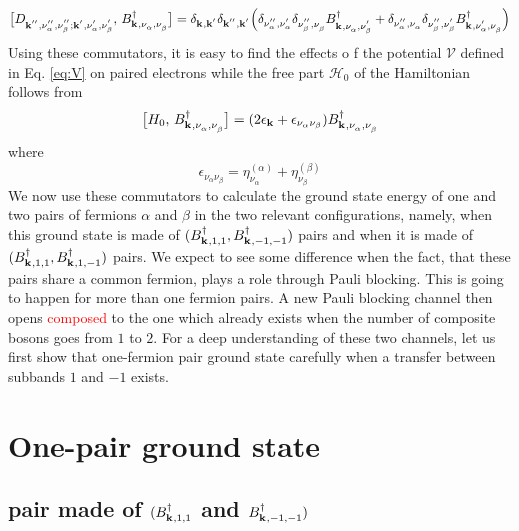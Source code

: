 \documentclass[11pt]{article} %
\newcommand{\ns}[1]{\textcolor{red}{#1}}
\begin{document}
\begin{equation}
\big[D^{}_{\mathbf{k}^{'' },\nu_{\alpha}^{''},\nu_{\beta}^{''};\mathbf{k}^{' },\nu_{\alpha}^{'},\nu_{\beta}^{'}},\,B^{\dagger}_{\mathbf{k}^{ },\nu_{\alpha}^{},\nu_{\beta}^{}}\big]=
	\delta_{\mathbf{k}^{ },\mathbf{k}^{'}}\delta_{\mathbf{k}^{'' },\mathbf{k}^{'}}
	\Big(\delta_{\nu_{\alpha}^{''},\nu_{\alpha}^{'}}\delta_{\nu_{\beta}^{''},\nu_{\beta}^{}}B^{\dagger}_{\mathbf{k}^{ },\nu_{\alpha}^{},\nu_{\beta}^{'}}+
	\delta_{\nu_{\alpha}^{''},\nu_{\alpha}^{}}\delta_{\nu_{\beta}^{''},\nu_{\beta}^{'}}B^{\dagger}_{\mathbf{k}^{ },\nu_{\alpha}^{'},\nu_{\beta}^{}}\Big)
\end{equation}
Using these commutators, it is easy to find the effects o f the potential $\mathcal{V}$ defined in Eq. \ref{eq:V} on paired electrons while the free part $\mathcal{H}_0$ of the Hamiltonian follows from
\begin{equation}\label{eq:h0B}
\big[H_0,\,B^{\dagger}_{\mathbf{k}^{ },\nu_{\alpha}^{},\nu_{\beta}^{}}\big]=
	(2\epsilon_{\mathbf{k}}+\epsilon_{\nu_{\alpha}\nu_{\beta}})B^{\dagger}_{\mathbf{k}^{ },\nu_{\alpha}^{},\nu_{\beta}^{}}
\end{equation}
where 
\begin{equation}
\epsilon_{\nu_{\alpha}\nu_{\beta}}=\eta_{\nu_{\alpha}}^{(\alpha)}+\eta_{\nu_{\beta}}^{(\beta)}
\end{equation}
We now use these commutators to calculate the ground state energy of one and two pairs of fermions $\alpha$ and $\beta$ in the two relevant configurations, namely, when this ground state is made of $(B^{\dagger}_{\mathbf{k}^{ },1,1}, B^{\dagger}_{\mathbf{k}^{ },-1,-1})$ pairs and when it is made of $(B^{\dagger}_{\mathbf{k}^{ },1,1}, B^{\dagger}_{\mathbf{k}^{ },1,-1})$ pairs. We expect to see some difference when the fact, that these pairs share a common fermion, plays a role through Pauli blocking.  This is going to happen for more than one fermion pairs.  A new Pauli blocking channel then opens \ns{composed} to the one which already exists when the number of composite bosons goes from $1$ to $2$.  For a deep understanding of these two channels, let us first show that one-fermion pair ground state carefully when a transfer between subbands $1$ and $-1$ exists. 

\section{One-pair ground state}
\subsection{pair made of $(B^{\dagger}_{\mathbf{k}^{ },1,1}$ and $B^{\dagger}_{\mathbf{k}^{ },-1,-1})$}
\end{document}
